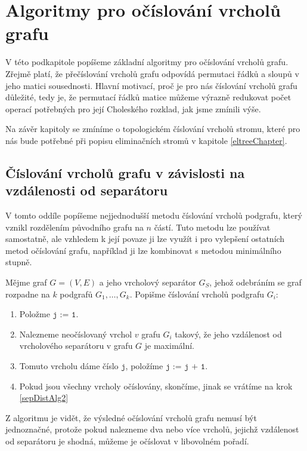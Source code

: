 \documentclass{ctuthesis}
\theoremstyle{plain}
\theoremstyle{definition}
\begin{document}
\section{Algoritmy pro očíslování vrcholů grafu}
\label{Numbering}
V této podkapitole popíšeme základní algoritmy pro očíslování vrcholů grafu. Zřejmě platí, že přečíslování vrcholů grafu odpovídá permutaci řádků a sloupů v jeho matici sousednosti. Hlavní motivací, proč je pro nás číslování vrcholů grafu důležité, tedy je, že permutací řádků matice můžeme výrazně redukovat počet operací potřebných pro její Choleského rozklad, jak jsme zmínili výše.

Na závěr kapitoly se zmíníme o topologickém číslování vrcholů stromu, které pro nás bude potřebné při popisu eliminačních stromů v kapitole \ref{eltreeChapter}.

\subsection{Číslování vrcholů grafu v závislosti na vzdálenosti od separátoru}
\label{sepDistOrdering}

V tomto oddíle popíšeme nejjednodušší metodu číslování vrcholů podgrafu, který vznikl rozdělením původního grafu na $n$ částí.
Tuto metodu lze používat samostatně, ale vzhledem k její povaze ji lze využít i pro vylepšení ostatních metod očíslování grafu,
například ji lze kombinovat s metodou minimálního stupně.

Mějme graf $G = (V,E)$ a jeho vrcholový separátor $G_S$, jehož odebráním se graf rozpadne na $k$ podgrafů $G_1, \ldots, G_k$.
Popišme číslování vrcholů podgrafu $G_i$:

\begin{enumerate}
  \item Položme $\texttt{j := 1}$.
  \item \label{sepDistAlg2} Nalezneme neočíslovaný vrchol $v$ grafu $G_i$ takový, že jeho vzdálenost od vrcholového separátoru v grafu $G$ je maximální.
  \item Tomuto vrcholu dáme číslo $\texttt{j}$, položíme $\texttt{j := j + 1}$.
  \item Pokud jsou všechny vrcholy očíslovány, skončíme, jinak se vrátíme na krok \ref{sepDistAlg2}
\end{enumerate}

Z algoritmu je vidět, že výsledné očíslování vrcholů grafu nemusí být jednoznačné, protože pokud nalezneme dva nebo více vrcholů, jejichž vzdálenost od separátoru je shodná, můžeme je očíslovat v libovolném pořadí.
\end{document}
